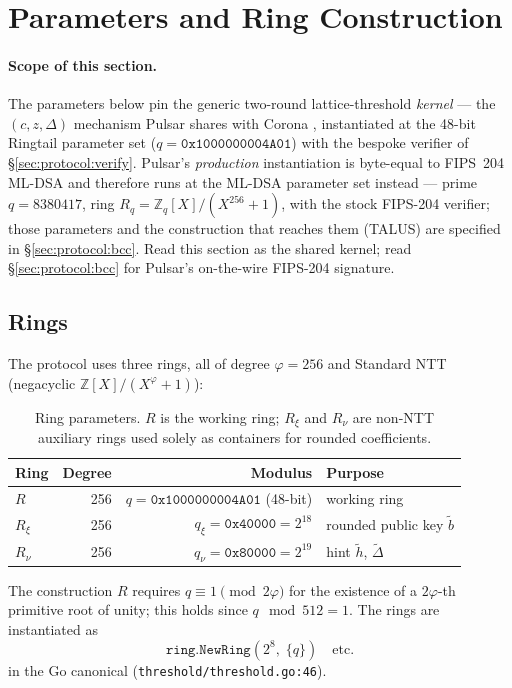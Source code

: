 \section{Parameters and Ring Construction}
\label{sec:parameters}

\paragraph{Scope of this section.} The parameters below pin the generic
two-round lattice-threshold \emph{kernel} --- the $(c, z, \Delta)$
mechanism Pulsar shares with Corona \cite{corona}, instantiated at the
48-bit Ringtail parameter set ($q = \mathtt{0x1000000004A01}$) with the
bespoke verifier of \S\ref{sec:protocol:verify}. Pulsar's
\emph{production} instantiation is byte-equal to FIPS~204 ML-DSA and
therefore runs at the ML-DSA parameter set instead --- prime $q =
8380417$, ring $R_q = \mathbb{Z}_q[X]/(X^{256}+1)$, with the stock
FIPS-204 verifier; those parameters and the construction that reaches
them (TALUS) are specified in \S\ref{sec:protocol:bcc}. Read this section
as the shared kernel; read \S\ref{sec:protocol:bcc} for Pulsar's
on-the-wire FIPS-204 signature.

\subsection{Rings}

The protocol uses three rings, all of degree $\varphi = 256$ and Standard NTT \cite{lp029} (negacyclic $\mathbb{Z}[X]/(X^\varphi+1)$):

\begin{table}[H]
\centering
\caption{Ring parameters. $R$ is the working ring; $R_\xi$ and $R_\nu$ are non-NTT auxiliary rings used solely as containers for rounded coefficients.}
\begin{tabular}{lrrl}
\toprule
Ring & Degree & Modulus & Purpose \\
\midrule
$R$    & 256 & $q   = \texttt{0x1000000004A01}$ (48-bit) & working ring \\
$R_\xi$ & 256 & $q_\xi  = \texttt{0x40000} = 2^{18}$ & rounded public key $\tilde b$ \\
$R_\nu$ & 256 & $q_\nu  = \texttt{0x80000} = 2^{19}$ & hint $\tilde h$, $\tilde \Delta$ \\
\bottomrule
\end{tabular}
\end{table}

The construction $R$ requires $q \equiv 1 \pmod{2\varphi}$ for the existence of a $2\varphi$-th primitive root of unity; this holds since $q \mod 512 = 1$. The rings are instantiated as
\[
\texttt{ring.NewRing}(2^{8},\; \{q\}) \quad \text{etc.}
\]
in the Go canonical (\texttt{threshold/threshold.go:46}).

